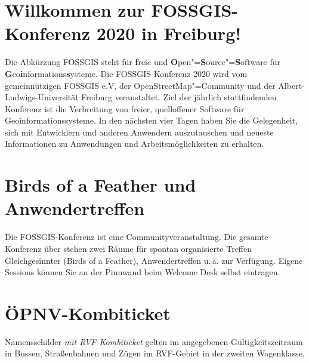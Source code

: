 \newpage
\section*{Willkommen zur FOSSGIS-Konferenz 2020 in Freiburg!} \label{welcome}
Die Abkürzung { FOSSGIS} steht für {\bfseries f}reie und {\bfseries O}pen"={\bfseries S}ource"={\bfseries S}oftware für {\bfseries G}eo{\bfseries i}nformations{\bfseries s}ysteme.
Die FOSSGIS-Konferenz 2020 wird vom gemeinnützigen FOSSGIS e.V, der
OpenStreetMap"=Community und der Albert-Ludwigs-Universität Freiburg
veranstaltet.
Ziel der jährlich stattfindenden Konferenz ist die Verbreitung von freier,
quelloffener Software für Geoinformationssysteme. In den nächsten vier Tagen
haben Sie die Gelegenheit, sich mit Entwicklern und anderen Anwendern
auszutauschen und \mbox{neueste} Informationen zu Anwendungen und
Arbeitsmöglichkeiten zu erhalten.

\section*{Birds of a Feather und Anwendertreffen}
Die FOSSGIS-Konferenz ist eine Communityveranstaltung.
Die gesamte Konferenz über stehen zwei Räume für spontan organisierte
Treffen Gleichgesinnter (Birds of a Feather), Anwendertreffen u.\,ä.
zur Verfügung. Eigene Sessions können Sie an der Pinnwand beim
Welcome Desk selbst eintragen.

\section*{ÖPNV-Kombiticket}
Namensschilder \emph{mit RVF-Kombiticket} gelten im angegebenen Gültigkeitszeitraum in Bussen, Straßenbahnen und Zügen im RVF-Gebiet in der zweiten Wagenklasse.

\newpage

\newpage

\newpage

\newpage

\newpage

\newpage

